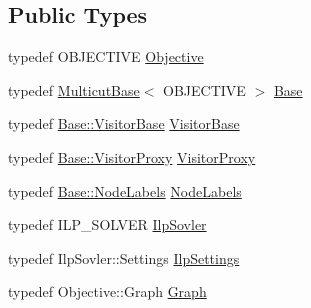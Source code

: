 \subsection*{Public Types}
\begin{DoxyCompactItemize}
\item 
typedef O\+B\+J\+E\+C\+T\+I\+V\+E \hyperlink{classnifty_1_1graph_1_1optimization_1_1multicut_1_1MulticutIlp_a1c9fe5899608fc9c8e32bde6648c8278}{Objective}
\item 
typedef \hyperlink{classnifty_1_1graph_1_1MulticutBase}{Multicut\+Base}$<$ O\+B\+J\+E\+C\+T\+I\+V\+E $>$ \hyperlink{classnifty_1_1graph_1_1optimization_1_1multicut_1_1MulticutIlp_acf2fdd623f396ac26bcb15941759eb5a}{Base}
\item 
typedef \hyperlink{classnifty_1_1graph_1_1MulticutBase_a5882fb69df59d8113f6a81a0dac26eaa}{Base\+::\+Visitor\+Base} \hyperlink{classnifty_1_1graph_1_1optimization_1_1multicut_1_1MulticutIlp_a0dd77b07238eb761a1db58b058c0186c}{Visitor\+Base}
\item 
typedef \hyperlink{classnifty_1_1graph_1_1MulticutBase_a6ede271a3cb0ae4711a7e9da2b07efa9}{Base\+::\+Visitor\+Proxy} \hyperlink{classnifty_1_1graph_1_1optimization_1_1multicut_1_1MulticutIlp_ab78a646c0aea8aa633ff7155f349d7a6}{Visitor\+Proxy}
\item 
typedef \hyperlink{classnifty_1_1graph_1_1MulticutBase_afba61ad2919d0fad20b3745af19309da}{Base\+::\+Node\+Labels} \hyperlink{classnifty_1_1graph_1_1optimization_1_1multicut_1_1MulticutIlp_a0b5224bc8998dda829c920e8d3338fee}{Node\+Labels}
\item 
typedef I\+L\+P\+\_\+\+S\+O\+L\+V\+E\+R \hyperlink{classnifty_1_1graph_1_1optimization_1_1multicut_1_1MulticutIlp_ac85f089fd12431bd80f33c83dd45bdc7}{Ilp\+Sovler}
\item 
typedef Ilp\+Sovler\+::\+Settings \hyperlink{classnifty_1_1graph_1_1optimization_1_1multicut_1_1MulticutIlp_a61b515766e63459084d16525e62c527d}{Ilp\+Settings}
\item 
typedef Objective\+::\+Graph \hyperlink{classnifty_1_1graph_1_1optimization_1_1multicut_1_1MulticutIlp_a98f6b00c67ccecf9e2c5ad63d8d2bade}{Graph}
\end{DoxyCompactItemize}
